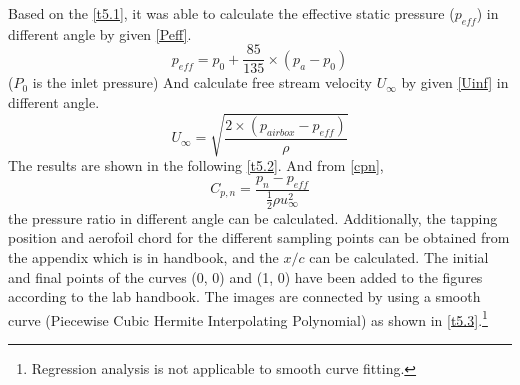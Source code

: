 Based on the \autoref{t5.1}, it was able to calculate the effective static pressure ($p_{eff}$) in different angle by given \autoref{Peff}.
\begin{equation}
    \label{Peff}
   p_{eff}=p_{0}+\frac{85}{135}\times(p_{a}-p_{0})
    \end{equation}
($P_0$ is the inlet pressure)
And calculate free stream velocity $U_\infty$ by given \autoref{Uinf} in different angle.
\begin{equation}
    \label{Uinf}
    U_{\infty}={\sqrt{\frac{2\times(p_{airbox}-p_{eff})}{\rho}}}
    \end{equation}
The results are shown in the following \autoref{t5.2}.
And from \autoref{cpn},
\begin{equation}
    \label{cpn}
    C_{p,n}={\frac{p_n-p_{eff}}{{\frac{1}{2}}\rho u_{\infty}^{2}}}
    \end{equation}
the pressure ratio in different angle can be calculated. Additionally, the tapping position and aerofoil chord for the different sampling points can be obtained from the appendix which is in handbook, and the $x/c$ can be calculated. The initial and final points of the curves (0, 0) and (1, 0) have been added to the figures according to the lab handbook. The images are connected by using a smooth curve (Piecewise Cubic Hermite Interpolating Polynomial) as shown in \autoref{t5.3}.\footnote{Regression analysis is not applicable to smooth curve fitting.}
\begin{table}[htbp]
    \caption{$p_{eff}$ and $U_\infty$ in different angle (Unit: Pa and m/s)} 
	\label{t5.2}
    \end{table}

